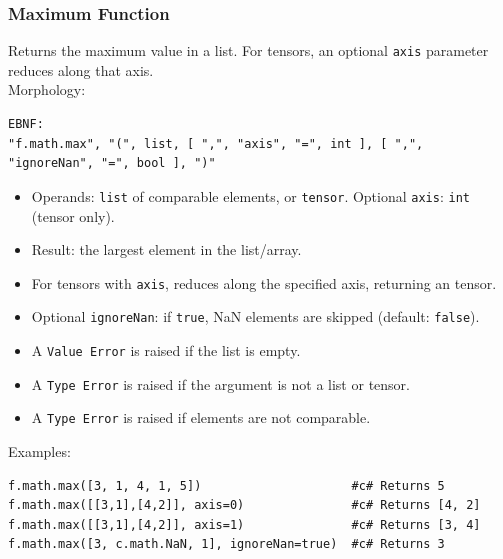 \subsubsection{Maximum Function}
Returns the maximum value in a list. For tensors, an optional \texttt{axis} parameter reduces along that axis. \\
Morphology:
\begin{verbatim}
EBNF:
"f.math.max", "(", list, [ ",", "axis", "=", int ], [ ",", "ignoreNan", "=", bool ], ")"
\end{verbatim}
\begin{itemize}
\item Operands: \texttt{list} of comparable elements, or \texttt{tensor}. Optional \texttt{axis}: \texttt{int} (tensor only).
\item Result: the largest element in the list/array.
\item For tensors with \texttt{axis}, reduces along the specified axis, returning an tensor.
\item Optional \texttt{ignoreNan}: if \texttt{true}, NaN elements are skipped (default: \texttt{false}).
\item A \texttt{Value Error} is raised if the list is empty.
\item A \texttt{Type Error} is raised if the argument is not a list or tensor.
\item A \texttt{Type Error} is raised if elements are not comparable.
\end{itemize}
Examples:
\begin{verbatim}
f.math.max([3, 1, 4, 1, 5])                     #c# Returns 5
f.math.max([[3,1],[4,2]], axis=0)               #c# Returns [4, 2]
f.math.max([[3,1],[4,2]], axis=1)               #c# Returns [3, 4]
f.math.max([3, c.math.NaN, 1], ignoreNan=true)  #c# Returns 3
\end{verbatim}

